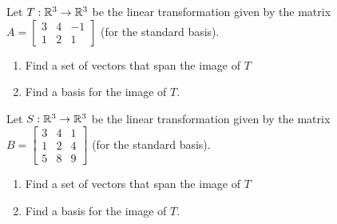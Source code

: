 \begin{applicationActivities}{2}{19}
\begin{activity}{0}
Let $T: \mathbb{R}^3 \rightarrow \mathbb{R}^3$ be the linear transformation given by the matrix $A=\begin{bmatrix} 3 & 4 & -1 \\ 1 & 2 & 1 \end{bmatrix}$ (for the standard basis).
\begin{enumerate}[1)]
\item Find a set of vectors that span the image of $T$
\item Find a basis for the image of $T$.
\end{enumerate}
\end{activity}

\begin{activity}{0}
Let $S: \mathbb{R}^3 \rightarrow \mathbb{R}^3$ be the linear transformation given by the matrix $B=\begin{bmatrix} 3 & 4 & 1 \\ 1 & 2 & 4 \\ 5 & 8 & 9  \end{bmatrix}$ (for the standard basis).
\begin{enumerate}[1)]
\item Find a set of vectors that span the image of $T$
\item Find a basis for the image of $T$.
\end{enumerate}
\end{activity}

\end{applicationActivities}
